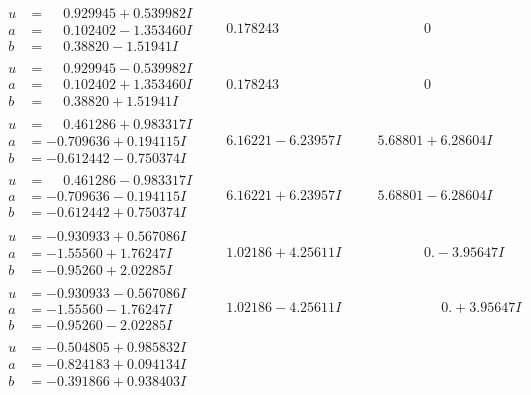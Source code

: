 \documentclass[1p]{elsarticle_modified}
\theoremstyle{definition}
\begin{document}
$$\begin{array}{c|c|c}
\begin{aligned}
u &= \phantom{-}0.929945 + 0.539982 I \\
a &= \phantom{-}0.102402 - 1.353460 I \\
b &= \phantom{-}0.38820 - 1.51941 I\end{aligned}
 & \phantom{-}0.178243\phantom{ +0.000000I} & \phantom{-0.000000 } 0 \\ \hline\begin{aligned}
u &= \phantom{-}0.929945 - 0.539982 I \\
a &= \phantom{-}0.102402 + 1.353460 I \\
b &= \phantom{-}0.38820 + 1.51941 I\end{aligned}
 & \phantom{-}0.178243\phantom{ +0.000000I} & \phantom{-0.000000 } 0 \\ \hline\begin{aligned}
u &= \phantom{-}0.461286 + 0.983317 I \\
a &= -0.709636 + 0.194115 I \\
b &= -0.612442 - 0.750374 I\end{aligned}
 & \phantom{-}6.16221 - 6.23957 I & \phantom{-}5.68801 + 6.28604 I \\ \hline\begin{aligned}
u &= \phantom{-}0.461286 - 0.983317 I \\
a &= -0.709636 - 0.194115 I \\
b &= -0.612442 + 0.750374 I\end{aligned}
 & \phantom{-}6.16221 + 6.23957 I & \phantom{-}5.68801 - 6.28604 I \\ \hline\begin{aligned}
u &= -0.930933 + 0.567086 I \\
a &= -1.55560 + 1.76247 I \\
b &= -0.95260 + 2.02285 I\end{aligned}
 & \phantom{-}1.02186 + 4.25611 I & \phantom{-0.000000 } 0. - 3.95647 I \\ \hline\begin{aligned}
u &= -0.930933 - 0.567086 I \\
a &= -1.55560 - 1.76247 I \\
b &= -0.95260 - 2.02285 I\end{aligned}
 & \phantom{-}1.02186 - 4.25611 I & \phantom{-0.000000 -}0. + 3.95647 I \\ \hline\begin{aligned}
u &= -0.504805 + 0.985832 I \\
a &= -0.824183 + 0.094134 I \\
b &= -0.391866 + 0.938403 I\end{aligned}

\end{array}$$
\end{document}
